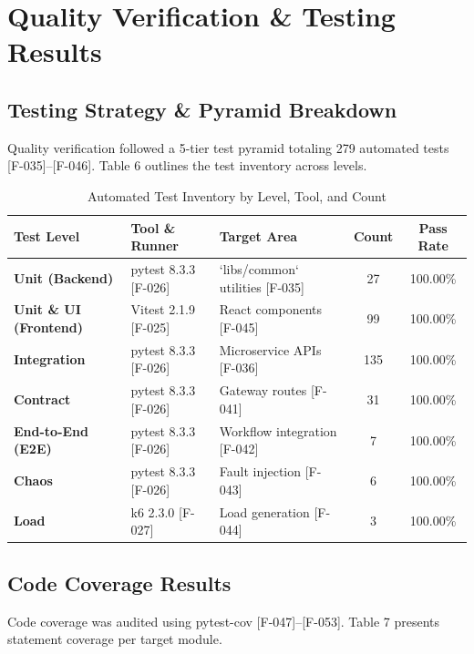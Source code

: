 \documentclass[11pt,a4paper]{article}
\begin{document}
\section{Quality Verification \& Testing Results}

\subsection{Testing Strategy \& Pyramid Breakdown}
Quality verification followed a 5-tier test pyramid totaling 279 automated tests [F-035]--[F-046]. Table 6 outlines the test inventory across levels.

\begin{table}[htbp]
\caption{Automated Test Inventory by Level, Tool, and Count}
\centering
\begin{tabularx}{\linewidth}{l X X c c}
\toprule
\textbf{Test Level} & \textbf{Tool \& Runner} & \textbf{Target Area} & \textbf{Count} & \textbf{Pass Rate} \\
\midrule
\textbf{Unit (Backend)} & pytest 8.3.3 [F-026] & `libs/common` utilities [F-035] & 27 & 100.00\% \\
\textbf{Unit \& UI (Frontend)} & Vitest 2.1.9 [F-025] & React components [F-045] & 99 & 100.00\% \\
\textbf{Integration} & pytest 8.3.3 [F-026] & Microservice APIs [F-036] & 135 & 100.00\% \\
\textbf{Contract} & pytest 8.3.3 [F-026] & Gateway routes [F-041] & 31 & 100.00\% \\
\textbf{End-to-End (E2E)} & pytest 8.3.3 [F-026] & Workflow integration [F-042] & 7 & 100.00\% \\
\textbf{Chaos} & pytest 8.3.3 [F-026] & Fault injection [F-043] & 6 & 100.00\% \\
\textbf{Load} & k6 2.3.0 [F-027] & Load generation [F-044] & 3 & 100.00\% \\
\bottomrule
\end{tabularx}
\end{table}

\subsection{Code Coverage Results}
Code coverage was audited using pytest-cov [F-047]--[F-053]. Table 7 presents statement coverage per target module.
\end{document}

